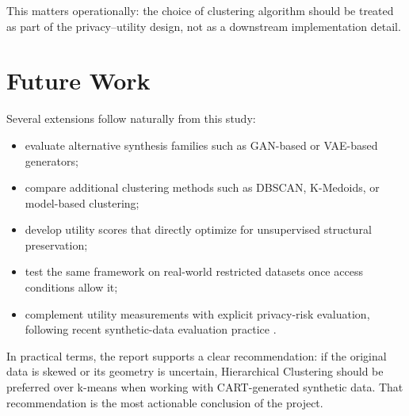 This matters operationally: the choice of clustering algorithm should be treated as part of the privacy--utility design, not as a downstream implementation detail.

\section{Future Work}
\label{sec:futurework}

Several extensions follow naturally from this study:
\begin{itemize}
  \item evaluate alternative synthesis families such as GAN-based or VAE-based generators;
  \item compare additional clustering methods such as DBSCAN, K-Medoids, or model-based clustering;
  \item develop utility scores that directly optimize for unsupervised structural preservation;
  \item test the same framework on real-world restricted datasets once access conditions allow it;
  \item complement utility measurements with explicit privacy-risk evaluation, following recent synthetic-data evaluation practice \cite{qian2024}.
\end{itemize}

In practical terms, the report supports a clear recommendation: if the original data is skewed or its geometry is uncertain, Hierarchical Clustering should be preferred over k-means when working with CART-generated synthetic data. That recommendation is the most actionable conclusion of the project.
